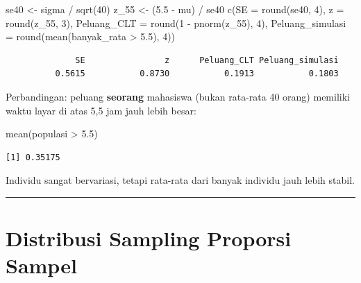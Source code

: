\documentclass[
  indonesian,
  letterpaper,
]{book}
\newenvironment{Shaded}{\begin{snugshade}}{\end{snugshade}}
\newcommand{\AttributeTok}[1]{\textcolor[rgb]{0.40,0.45,0.13}{#1}}
\newcommand{\DecValTok}[1]{\textcolor[rgb]{0.68,0.00,0.00}{#1}}
\newcommand{\FloatTok}[1]{\textcolor[rgb]{0.68,0.00,0.00}{#1}}
\newcommand{\FunctionTok}[1]{\textcolor[rgb]{0.28,0.35,0.67}{#1}}
\newcommand{\NormalTok}[1]{\textcolor[rgb]{0.00,0.23,0.31}{#1}}
\newcommand{\OtherTok}[1]{\textcolor[rgb]{0.00,0.23,0.31}{#1}}
\newcommand{\SpecialCharTok}[1]{\textcolor[rgb]{0.37,0.37,0.37}{#1}}
\begin{document}
\begin{Shaded}
\begin{Highlighting}[]
\NormalTok{se40 }\OtherTok{\textless{}{-}}\NormalTok{ sigma }\SpecialCharTok{/} \FunctionTok{sqrt}\NormalTok{(}\DecValTok{40}\NormalTok{)}
\NormalTok{z\_55 }\OtherTok{\textless{}{-}}\NormalTok{ (}\FloatTok{5.5} \SpecialCharTok{{-}}\NormalTok{ mu) }\SpecialCharTok{/}\NormalTok{ se40}
\FunctionTok{c}\NormalTok{(}\AttributeTok{SE =} \FunctionTok{round}\NormalTok{(se40, }\DecValTok{4}\NormalTok{), }\AttributeTok{z =} \FunctionTok{round}\NormalTok{(z\_55, }\DecValTok{3}\NormalTok{),}
  \AttributeTok{Peluang\_CLT =} \FunctionTok{round}\NormalTok{(}\DecValTok{1} \SpecialCharTok{{-}} \FunctionTok{pnorm}\NormalTok{(z\_55), }\DecValTok{4}\NormalTok{),}
  \AttributeTok{Peluang\_simulasi =} \FunctionTok{round}\NormalTok{(}\FunctionTok{mean}\NormalTok{(banyak\_rata }\SpecialCharTok{\textgreater{}} \FloatTok{5.5}\NormalTok{), }\DecValTok{4}\NormalTok{))}
\end{Highlighting}
\end{Shaded}

\begin{verbatim}
              SE                z      Peluang_CLT Peluang_simulasi 
          0.5615           0.8730           0.1913           0.1803 
\end{verbatim}

Perbandingan: peluang \textbf{seorang} mahasiswa (bukan rata-rata 40
orang) memiliki waktu layar di atas 5,5 jam jauh lebih besar:

\begin{Shaded}
\begin{Highlighting}[]
\FunctionTok{mean}\NormalTok{(populasi }\SpecialCharTok{\textgreater{}} \FloatTok{5.5}\NormalTok{)}
\end{Highlighting}
\end{Shaded}

\begin{verbatim}
[1] 0.35175
\end{verbatim}

Individu sangat bervariasi, tetapi rata-rata dari banyak individu jauh
lebih stabil.

\begin{center}\rule{0.5\linewidth}{0.5pt}\end{center}

\section{Distribusi Sampling Proporsi
Sampel}\label{distribusi-sampling-proporsi-sampel}
\end{document}

